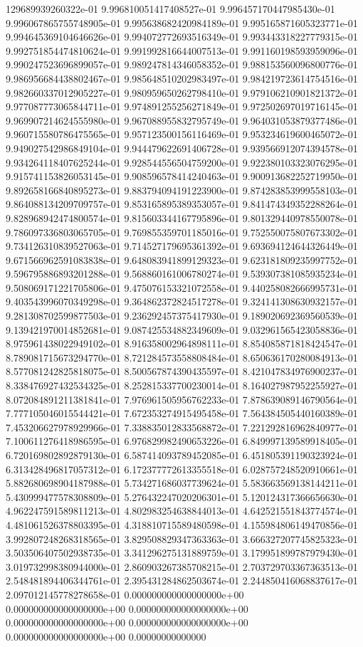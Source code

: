 129689939260322e-01	9.996810051417408527e-01	9.996457170447985430e-01	9.996067865755748905e-01	9.995638682420984189e-01	9.995165871605323771e-01	9.994645369104646626e-01	9.994072772693516349e-01	9.993443318227779315e-01	9.992751854474810624e-01	9.991992816644007513e-01	9.991160198593959096e-01	9.990247523696899057e-01	9.989247814346058352e-01	9.988153560096800776e-01	9.986956684438802467e-01	9.985648510202983497e-01	9.984219723614754516e-01	9.982660337012905227e-01	9.980959650262798410e-01	9.979106210901821372e-01	9.977087773065844711e-01	9.974891255256271849e-01	9.972502697019716145e-01	9.969907214624555980e-01	9.967088955832795749e-01	9.964031053879377486e-01	9.960715580786475565e-01	9.957123500156116469e-01	9.953234619600465072e-01	9.949027542986849104e-01	9.944479622691406728e-01	9.939566912074394578e-01	9.934264118407625244e-01	9.928544556504759200e-01	9.922380103323076295e-01	9.915741153826053145e-01	9.908596578414240463e-01	9.900913682252719950e-01	9.892658166840895273e-01	9.883794094191223900e-01	9.874283853999558103e-01	9.864088134209709757e-01	9.853165895389353057e-01	9.841474349352288264e-01	9.828968942474800574e-01	9.815603344167795896e-01	9.801329440978550078e-01	9.786097336803065705e-01	9.769855359701185016e-01	9.752550075807673302e-01	9.734126310839527063e-01	9.714527179695361392e-01	9.693694124644326449e-01	9.671566962591083838e-01	9.648083941899129323e-01	9.623181809235997752e-01	9.596795886893201288e-01	9.568860161006780274e-01	9.539307381085935234e-01	9.508069171221705806e-01	9.475076153321072558e-01	9.440258082666995731e-01	9.403543996070349298e-01	9.364862372824517278e-01	9.324141308630932157e-01	9.281308702599877503e-01	9.236292457375417930e-01	9.189020692369560539e-01	9.139421970014852681e-01	9.087425534882349609e-01	9.032961565423058836e-01	8.975961438022949102e-01	8.916358002964898111e-01	8.854085871818424547e-01	8.789081715673294770e-01	8.721284573558808484e-01	8.650636170280084913e-01	8.577081242825818075e-01	8.500567874390435597e-01	8.421047834976900237e-01	8.338476927432534325e-01	8.252815337700230014e-01	8.164027987952255927e-01	8.072084891211381841e-01	7.976961505956762233e-01	7.878639089146790564e-01	7.777105046015544421e-01	7.672353274915495458e-01	7.564384505440160389e-01	7.453206627978929966e-01	7.338835012833568872e-01	7.221292816962840977e-01	7.100611276418986595e-01	6.976829982490653226e-01	6.849997139589918405e-01	6.720169802892879130e-01	6.587414093789452085e-01	6.451805391190323924e-01	6.313428496817057312e-01	6.172377772613355518e-01	6.028757248520910661e-01	5.882680698904187988e-01	5.734271686037739624e-01	5.583663569138144211e-01	5.430999477578308809e-01	5.276432247020206301e-01	5.120124317366656630e-01	4.962247591589811213e-01	4.802983254638844013e-01	4.642521551843774574e-01	4.481061526378803395e-01	4.318810715589480598e-01	4.155984806149470856e-01	3.992807248268318565e-01	3.829508829347363363e-01	3.666327207745825323e-01	3.503506407502938735e-01	3.341296275131889759e-01	3.179951899787979430e-01	3.019732998380944000e-01	2.860903267385708215e-01	2.703729703367363513e-01	2.548481894406344761e-01	2.395431284862503674e-01	2.244850416068837617e-01	2.097012145778278658e-01	0.000000000000000000e+00	0.000000000000000000e+00	0.000000000000000000e+00	0.000000000000000000e+00	0.000000000000000000e+00	0.000000000000000000e+00	0.00000000000000